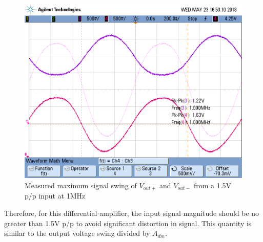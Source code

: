 \FloatBarrier

\begin{figure}[h!]
	\centering
	\includegraphics[scale=0.60]{./images/scope_6}
	\caption{Measured maximum signal swing of $V_{out+}$ and $V_{out-}$ from a 1.5\si{\volt} p/p input at 1MHz}
	\label{fig:scope_6}
\end{figure}

\FloatBarrier

Therefore, for this differential amplifier, the input signal magnitude should be no greater than 1.5V p/p to avoid significant distortion in signal.
This quantity is similar to the output voltage swing divided by $A_{dm}$.